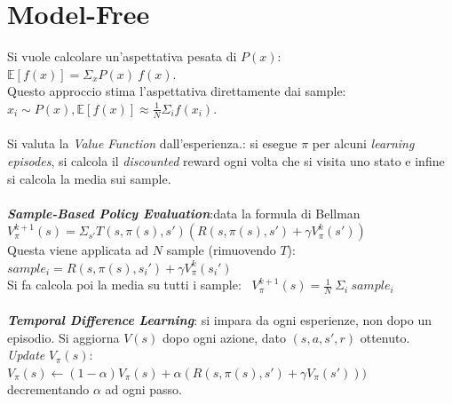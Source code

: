 \documentclass[a4paper, notitlepage, 9pt]{extreport}
\begin{document}
\section*{Model-Free}
Si vuole calcolare un'aspettativa pesata di $P(x)$: ~$\mathbb{E}[f(x)] = \Sigma_x P(x) ~f(x)$.\\
Questo approccio stima l'aspettativa direttamente dai sample: $x_i \sim P(x), \mathbb{E}[f(x)] \approx \frac{1}{N} \Sigma_i f(x_i)$.\\\\
Si valuta la \textit{Value Function} dall'esperienza.: si esegue $\pi$ per alcuni \textit{learning episodes}, si calcola il \textit{discounted} reward ogni volta che si visita uno stato e infine si calcola la media sui sample.\\\\
\textit{\textbf{Sample-Based Policy Evaluation}}:data la formula di Bellman $V_\pi^{k+1}(s) = \Sigma_{s'} T(s, \pi(s), s') (R(s, \pi(s), s') + \gamma V_\pi^k(s'))$\\
Questa viene applicata ad $N$ sample (rimuovendo $T$): ~$sample_i = R(s, \pi(s), s_i') + \gamma V_\pi^k(s_i')$\\
Si fa calcola poi la media su tutti i sample: ~$V_\pi^{k+1}(s) = \frac{1}{N} ~\Sigma_i ~sample_i$\\
\\
\textit{\textbf{Temporal Difference Learning}}: si impara da ogni esperienze, non dopo un episodio. Si aggiorna $V(s)$ dopo ogni azione, dato $(s, a, s', r)$ ottenuto.\\
\textit{Update} $V_\pi(s)$: ~~$V_\pi(s) \leftarrow (1 - \alpha) V_\pi(s) + \alpha(R(s, \pi(s), s') + \gamma V_\pi(s')))$ ~ decrementando $\alpha$ ad ogni passo.
\end{document}
